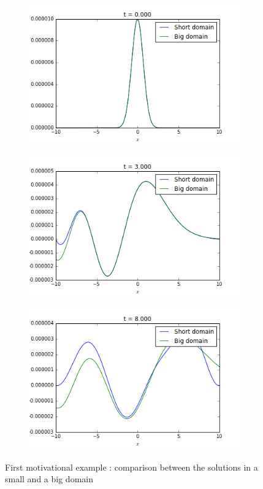 \begin{figure}[h]
	\begin{subfigure}{.3\linewidth}
		\center
		\includegraphics[scale=.3]{figures/motivational1A.png}	
	\end{subfigure}
	\begin{subfigure}{.3\linewidth}
		\center
		\includegraphics[scale=.3]{figures/motivational1B.png}	
	\end{subfigure}
	\begin{subfigure}{.3\linewidth}
		\center
		\includegraphics[scale=.3]{figures/motivational1C.png}	
	\end{subfigure}
	\caption{First motivational example : comparison between the solutions in a small and a big domain}
\end{figure}

